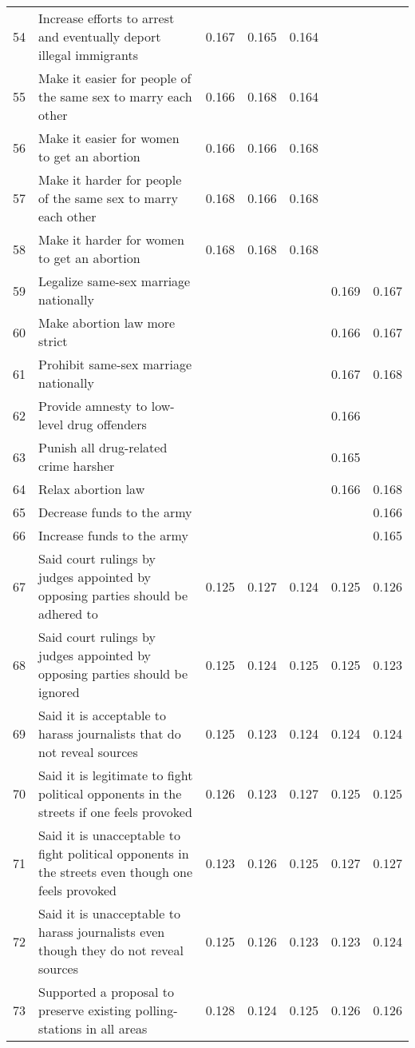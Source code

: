 \begin{longtable}{lp{7cm}ccccc}
  54 & Increase efforts to arrest and eventually deport illegal immigrants & 0.167 & 0.165 & 0.164 &  &  \\ 
  55 & Make it easier for people of the same sex to marry each other & 0.166 & 0.168 & 0.164 &  &  \\ 
  56 & Make it easier for women to get an abortion & 0.166 & 0.166 & 0.168 &  &  \\ 
  57 & Make it harder for people of the same sex to marry each other & 0.168 & 0.166 & 0.168 &  &  \\ 
  58 & Make it harder for women to get an abortion & 0.168 & 0.168 & 0.168 &  &  \\ 
  59 & Legalize same-sex marriage nationally &  &  &  & 0.169 & 0.167 \\ 
  60 & Make abortion law more strict &  &  &  & 0.166 & 0.167 \\ 
  61 & Prohibit same-sex marriage nationally &  &  &  & 0.167 & 0.168 \\ 
  62 & Provide amnesty to low-level drug offenders &  &  &  & 0.166 &  \\ 
  63 & Punish all drug-related crime harsher &  &  &  & 0.165 &  \\ 
  64 & Relax abortion law &  &  &  & 0.166 & 0.168 \\ 
  65 & Decrease funds to the army &  &  &  &  & 0.166 \\ 
  66 & Increase funds to the army &  &  &  &  & 0.165 \\ 
  67 & Said court rulings by judges appointed by opposing parties should be adhered to & 0.125 & 0.127 & 0.124 & 0.125 & 0.126 \\ 
  68 & Said court rulings by judges appointed by opposing parties should be ignored & 0.125 & 0.124 & 0.125 & 0.125 & 0.123 \\ 
  69 & Said it is acceptable to harass journalists that do not reveal sources & 0.125 & 0.123 & 0.124 & 0.124 & 0.124 \\ 
  70 & Said it is legitimate to fight political opponents in the streets if one feels provoked & 0.126 & 0.123 & 0.127 & 0.125 & 0.125 \\ 
  71 & Said it is unacceptable to fight political opponents in the streets even though one feels provoked & 0.123 & 0.126 & 0.125 & 0.127 & 0.127 \\ 
  72 & Said it is unacceptable to harass journalists even though they do not reveal sources & 0.125 & 0.126 & 0.123 & 0.123 & 0.124 \\ 
  73 & Supported a proposal to preserve existing polling-stations in all areas & 0.128 & 0.124 & 0.125 & 0.126 & 0.126 \\ 

\end{longtable}
